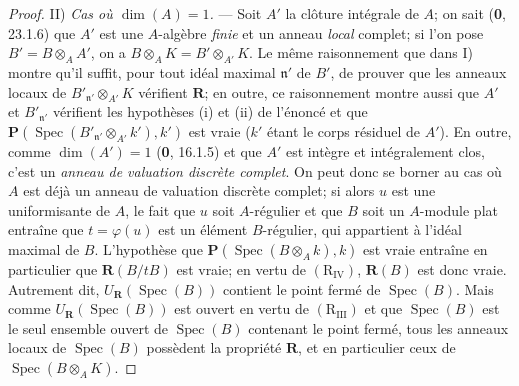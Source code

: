 \begin{proof}
II) \emph{Cas où $\dim(A)=1$.} --- Soit $A'$ la clôture intégrale de $A$;
on sait (\textbf{0}, 23.1.6) que $A'$ est une $A$-algèbre \emph{finie} et un anneau \emph{local}
complet; si l'on pose $B'=B\otimes_A A'$, on a
$B\otimes_A K=B'\otimes_{A'}K$. Le même raisonnement que dans I) montre
qu'il suffit, pour tout idéal maximal $\mathfrak n'$ de $B'$, de prouver que
les anneaux locaux de
$B'_{\mathfrak n'}\otimes_{A'}K$ vérifient $\boldsymbol R$; en outre, ce
raisonnement montre aussi que $A'$ et $B'_{\mathfrak n'}$ vérifient les
hypothèses (i) et (ii) de l'énoncé et que
$\boldsymbol P(\operatorname{Spec}(B'_{\mathfrak n'}\otimes_{A'}k'),k')$
est vraie ($k'$ étant le corps résiduel de $A'$). En outre, comme
$\dim(A')=1$ (\textbf{0}, 16.1.5) et que $A'$ est intègre et intégralement clos,
c'est un \emph{anneau de valuation discrète complet}. On peut donc se borner au
cas où $A$ est déjà un anneau de valuation discrète complet; si alors $u$
est une uniformisante de $A$, le fait que $u$ soit $A$-régulier et que $B$
soit un $A$-module plat entraîne que $t=\varphi(u)$ est un élément
$B$-régulier, qui appartient à l'idéal maximal de $B$. L'hypothèse que
$\boldsymbol P(\operatorname{Spec}(B\otimes_A k),k)$ est vraie entraîne en
particulier que $\boldsymbol R(B/tB)$ est vraie; en vertu de
$(\mathrm R_{\mathrm{IV}})$, $\boldsymbol R(B)$ est donc vraie. Autrement
dit, $U_{\mathbf R}(\operatorname{Spec}(B))$ contient le point fermé de
$\operatorname{Spec}(B)$. Mais comme
$U_{\mathbf R}(\operatorname{Spec}(B))$ est ouvert en vertu de
$(\mathrm R_{\mathrm{III}})$ et que $\operatorname{Spec}(B)$ est le seul
ensemble ouvert de $\operatorname{Spec}(B)$ contenant le point fermé, tous
les anneaux locaux de $\operatorname{Spec}(B)$ possèdent la propriété
$\boldsymbol R$, et en particulier ceux de
$\operatorname{Spec}(B\otimes_A K)$.


\end{proof}
